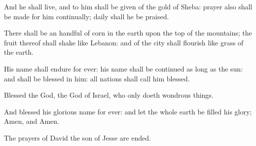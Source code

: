 {\par }{\Q {}And he shall
live, and to him shall be
given of the
gold of
Sheba: prayer also shall be
made for him
continually;
{}
daily shall he be
praised.


\par }{\Q {}There shall be an
handful of
corn in the
earth upon the
top of the
mountains; the
fruit thereof shall
shake like
Lebanon: and
{} of the
city shall
flourish like
grass of the
earth.


\par }{\Q {}His
name shall endure for
ever: his
name shall be
continued as long
as the
sun: and
{} shall be
blessed in him: all
nations shall call him
blessed.


\par }{\BB \par }
{\Q {}Blessed
{} the
{}
God, the
God of
Israel, who only
doeth wondrous
things.


\par }{\Q {}And
blessed
{} his
glorious
name for
ever: and let the whole
earth be
filled
{} his
glory;
Amen, and
Amen.


\par }{\Q {}The
prayers of
David the
son of
Jesse are
ended.




\par }
